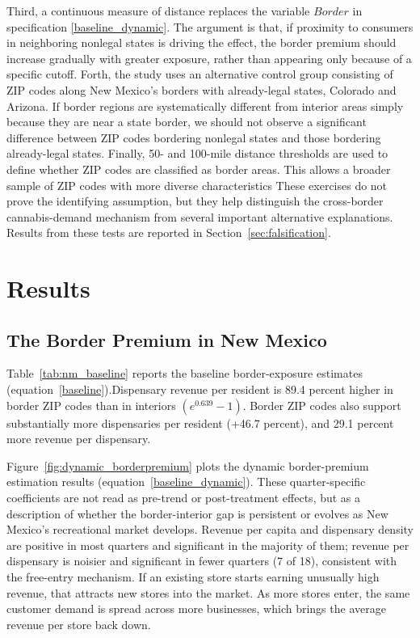 \documentclass[12pt]{article}
\begin{document}
 Third, a continuous measure of distance replaces the variable $Border$ in specification \ref{baseline_dynamic}. The argument is that, if proximity to consumers in neighboring nonlegal states is driving the effect, the border premium should increase gradually with greater exposure, rather than appearing only because of a specific cutoff. Forth, the study uses an alternative control group consisting of ZIP codes along New Mexico’s borders with already-legal states, Colorado and Arizona. If border regions are systematically different from interior areas simply because they are near a state border, we should not observe a significant difference between ZIP codes bordering nonlegal states and those bordering already-legal states.
 Finally, 50- and 100-mile distance thresholds are used to define whether ZIP codes are classified as border areas. This allows a broader sample of ZIP codes with more diverse characteristics These exercises do not prove the identifying assumption, but they help distinguish the cross-border cannabis-demand mechanism from several important alternative explanations. Results from these tests are reported in Section~\ref{sec:falsification}.

\section{Results}
\label{sec:result1}


\subsection{The Border Premium in New Mexico}

Table~\ref{tab:nm_baseline} reports the baseline border-exposure estimates (equation~\ref{baseline}).Dispensary revenue per resident is 89.4 percent higher in border ZIP codes than in interiors \(\left(e^{0.639}-1\right)\).
Border ZIP codes also support substantially more dispensaries per resident (+46.7 percent), and 29.1 percent more revenue per
dispensary. 

Figure~\ref{fig:dynamic_borderpremium} plots the dynamic border-premium estimation results (equation~\ref{baseline_dynamic}).
These quarter-specific coefficients are not read as pre-trend or post-treatment effects, but as a description of whether the border-interior gap is persistent or evolves as
New Mexico's recreational market develops. Revenue per capita and dispensary density are positive in most
quarters and significant in the majority of them;
revenue per dispensary is noisier and significant in fewer quarters (7 of 18), consistent with the free-entry
mechanism. If an existing store starts earning unusually high revenue, that attracts new stores into the market. As more stores enter, the same customer demand is spread across more businesses, which brings the average revenue per store back down.
\end{document}
